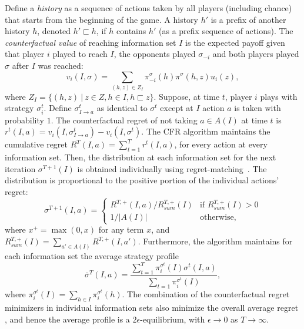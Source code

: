 Define a {\it history} as a sequence of actions taken by all players (including chance) that starts from the beginning of the game. 
A history $h'$ is a prefix of another history $h$, denoted $h' \sqsubset h$, if $h$ contains $h'$ (as a prefix sequence of actions).  
The {\it counterfactual value} of reaching information set $I$ is the expected payoff given that player $i$ played to reach $I$, the opponents played
$\sigma_{-i}$ and both players played $\sigma$ after $I$ was reached:
\begin{equation}
\label{eq:cfv}
v_i(I,\sigma) = \sum_{(h,z) \in Z_I} \pi^{\sigma}_{-i}(h) \pi^{\sigma}(h,z) u_i(z), 
\end{equation}
where $Z_I = \{ (h,z)~|~z \in Z, h \in I, h \sqsubset z \}$.
Suppose, at time $t$, player $i$ plays with strategy $\sigma^t_i$.
Define $\sigma^t_{I \rightarrow a}$ as identical to $\sigma^t$ except at $I$ action $a$ is taken with probability $1$.
The counterfactual regret of not taking $a \in A(I)$ at time $t$ is $r^t(I,a) = v_i(I,\sigma^t_{I \rightarrow a}) - v_i(I,\sigma^t)$.
The CFR algorithm maintains the cumulative regret $R^T(I,a) = \sum_{t=1}^T r^t(I,a)$, for every action at every information set.
Then, the distribution at each information set for the next iteration $\sigma^{T+1}(I)$ is obtained individually using
regret-matching~\cite{Hart00}. The distribution is proportional to the positive portion of the individual actions' regret:
\begin{equation*}
\label{eq:rm}
\sigma^{T+1}(I,a) = \left\{
\begin{array}{ll}
R^{T,+}(I,a) / R^{T,+}_{sum}(I) & \mbox{if } R^{T,+}_{sum}(I) > 0 \\ 
1 / |A(I)|                   & \mbox{otherwise,}
\end{array} \right.
\end{equation*}
where $x^+ = \max(0,x)$ for any term $x$, and $R^{T,+}_{sum}(I) = \sum_{a' \in A(I)} R^{T,+}(I,a')$. 
Furthermore, the algorithm maintains for each information set the average   strategy profile
\begin{equation}
\bar{\sigma}^T(I,a) = \frac{\sum_{t=1}^T \pi^{\sigma^t}_i(I) \sigma^t(I,a)}{\sum_{t=1} \pi^{\sigma^t}_i(I)}, 
\end{equation}
where $\pi^{\sigma^t}_i(I) = \sum_{h \in I}\pi^{\sigma^t}_i(h)$.
The combination of the counterfactual regret minimizers in individual information sets also minimize the overall 
average regret \cite{CFR}, and hence the average profile is a  $2\epsilon$-equilibrium, with $\epsilon \rightarrow 0$
as $T \rightarrow \infty$.

